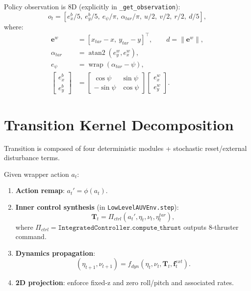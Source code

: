 \documentclass[11pt]{article}
\begin{document}
Policy observation is 8D (explicitly in \texttt{\_get\_observation}):
\begin{equation}
o_t = [e_x^b/5,\ e_y^b/5,\ e_\psi/\pi,\ \alpha_{tar}/\pi,\ u/2,\ v/2,\ r/2,\ d/5],
\end{equation}
where:
\begin{align}
\bm{e}^{w} &= [x_{tar}-x,\ y_{tar}-y]^\top,\qquad d=\|\bm{e}^{w}\|,\\
\alpha_{tar} &= \operatorname{atan2}(e^w_y,e^w_x),\\
e_\psi &= \operatorname{wrap}(\alpha_{tar}-\psi),\\
\begin{bmatrix}e_x^b\\e_y^b\end{bmatrix}
&= \begin{bmatrix}\cos\psi & \sin\psi\\-\sin\psi & \cos\psi\end{bmatrix}
\begin{bmatrix}e_x^w\\e_y^w\end{bmatrix}.
\end{align}

\section{Transition Kernel Decomposition}
Transition is composed of four deterministic modules + stochastic reset/external disturbance terms.

Given wrapper action \(a_t\):
\begin{enumerate}
  \item \textbf{Action remap}: \(a_t' = \phi(a_t)\).
  \item \textbf{Inner control synthesis} (in \texttt{LowLevelAUVEnv.step}):
  \begin{equation}
  \bm{T}_t = \Pi_{ctrl}(a_t',\eta_t,\nu_t,\eta_t^{tar}),
  \end{equation}
  where \(\Pi_{ctrl}=\texttt{IntegratedController.compute\_thrust}\) outputs 8-thruster command.
  \item \textbf{Dynamics propagation}:
  \begin{equation}
  (\eta_{t+1},\nu_{t+1}) = f_{dyn}(\eta_t,\nu_t,\bm{T}_t,\bm{f}^{ext}_t).
  \end{equation}
  \item \textbf{2D projection}: enforce fixed-z and zero roll/pitch and associated rates.
\end{enumerate}
\end{document}
